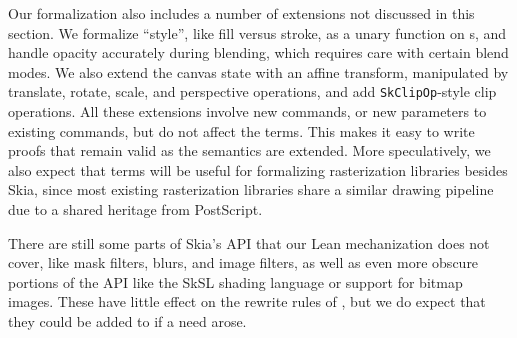 \documentclass[main.tex]{subfiles}
\begin{document}
Our formalization also includes a number of extensions
  not discussed in this section.
We formalize ``style'', like fill versus stroke,
  as a unary function on \Shape{}s,
  and handle opacity accurately during blending,
  which requires care with certain blend modes.
We also extend the canvas state with an affine transform,
  manipulated by translate, rotate, scale, and perspective operations,
  and add \texttt{SkClipOp}-style clip operations.
All these extensions involve new \muskia commands,
  or new parameters to existing \muskia commands,
  but do not affect the \Layer terms.
This makes it easy to write proofs that remain valid
  as the semantics are extended.
More speculatively, we also expect that
  \Layer terms will be useful for formalizing
  rasterization libraries besides Skia,
  since most existing rasterization libraries
  share a similar drawing pipeline
  due to a shared heritage from PostScript.

There are still some parts of Skia's API
  that our Lean mechanization does not cover,
  like mask filters, blurs, and image filters,
  as well as even more obscure portions of the API
  like the SkSL shading language or support for bitmap images.
These have little effect on the rewrite rules of ,
  but we do expect that they could be added to \muskia if a need arose.
\end{document}
